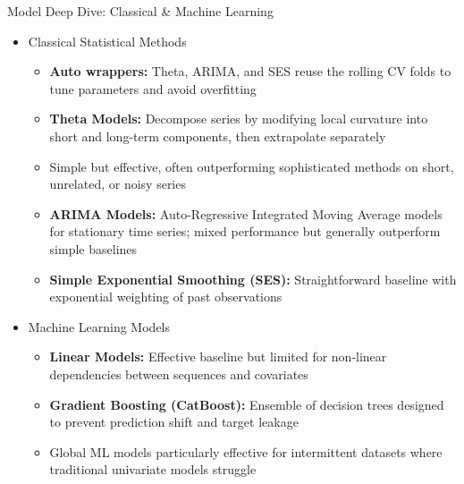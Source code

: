 \documentclass[ignorenonframetext, 9pt]{beamer}
\begin{document}
\begin{frame}{Model Deep Dive: Classical \& Machine Learning}
\begin{itemize}
    \item \alert{Classical Statistical Methods}
    \begin{itemize}
        \item \textbf{Auto wrappers:} Theta, ARIMA, and SES reuse the rolling CV folds to tune parameters and avoid overfitting
        \item \textbf{Theta Models:} Decompose series by modifying local curvature into short and long-term components, then extrapolate separately
        \vspace{0.2cm}
        \item Simple but effective, often outperforming sophisticated methods on short, unrelated, or noisy series
        \vspace{0.2cm}
        \item \textbf{ARIMA Models:} Auto-Regressive Integrated Moving Average models for stationary time series; mixed performance but generally outperform simple baselines
        \vspace{0.2cm}
        \item \textbf{Simple Exponential Smoothing (SES):} Straightforward baseline with exponential weighting of past observations
    \end{itemize}
    \vspace{0.3cm}
    \item \alert{Machine Learning Models}
    \begin{itemize}
        \item \textbf{Linear Models:} Effective baseline but limited for non-linear dependencies between sequences and covariates
        \vspace{0.2cm}
        \item \textbf{Gradient Boosting (CatBoost):} Ensemble of decision trees designed to prevent prediction shift and target leakage
        \vspace{0.2cm}
        \item Global ML models particularly effective for intermittent datasets where traditional univariate models struggle
    \end{itemize}
\end{itemize}
\end{frame}
\end{document}
